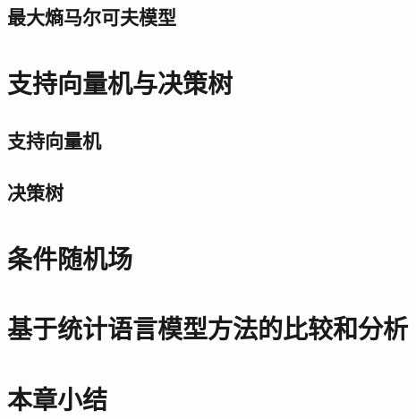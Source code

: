 \subsection{最大熵马尔可夫模型}

\section{支持向量机与决策树}
\subsection{支持向量机}
\subsection{决策树}


\section{条件随机场}
\section{基于统计语言模型方法的比较和分析}
\section{本章小结}
